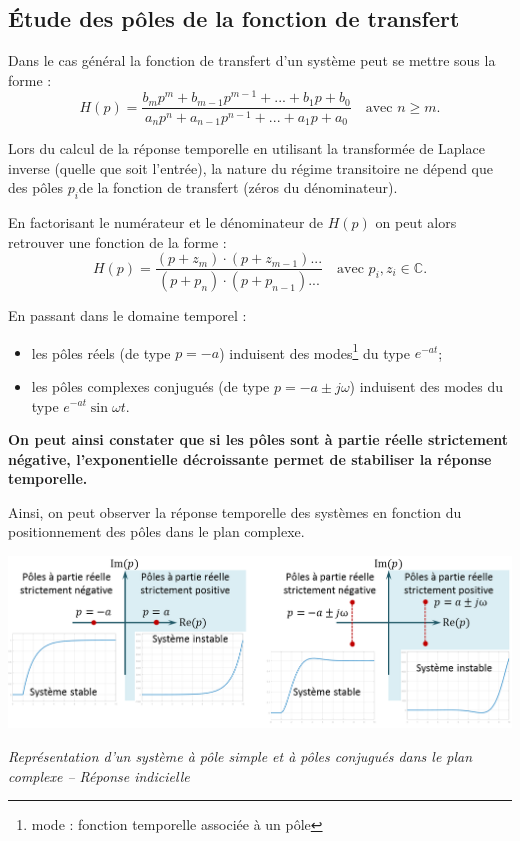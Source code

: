 \documentclass[10pt,fleqn]{article} %
\begin{document}
\subsection{Étude des pôles de la fonction de transfert}
Dans le cas général la fonction de transfert d'un système peut se mettre sous la forme :
$$
H(p)=\dfrac{b_mp^m + b_{m-1}p^{m-1}+...+b_1p+b_0}{a_np^n + a_{n-1}p^{n-1}+...+a_1p+a_0} \quad \text{avec } n\geq m.
$$

Lors du calcul de la réponse temporelle en utilisant la transformée de Laplace inverse (quelle que soit l'entrée), la nature du régime transitoire ne dépend que des pôles $p_i$de la fonction de transfert (zéros du dénominateur).

En factorisant le numérateur et le dénominateur de $H(p)$ on peut alors retrouver une fonction de la forme  :
$$
H(p)=\dfrac{\left(p+ z_m\right)\cdot \left(p+ z_{m-1}\right)...}{\left(p+ p_n\right)\cdot \left(p+ p_{n-1}\right)...} \quad \text{avec } p_i,z_i\in \mathbb{C}.
$$

En passant dans le domaine temporel : 
\begin{itemize}
\item les pôles réels (de type $p=-a$) induisent des modes\footnote{mode : fonction temporelle associée à un pôle} du type $e^{-at}$;
\item les pôles complexes conjugués (de type $p=-a\pm j\omega$) induisent des modes du type 
$e^{-at} \sin \omega t$.
\end{itemize}

\textbf{On peut ainsi constater que si les pôles sont à partie réelle strictement négative, l'exponentielle décroissante permet de stabiliser la réponse temporelle.}

Ainsi, on peut observer la réponse temporelle des systèmes en fonction du positionnement des pôles dans le plan complexe. 

\begin{center}
\includegraphics[width=14cm]{images/poles_simple_double}

\textit{Représentation d'un système à pôle simple et à pôles conjugués dans le plan complexe -- Réponse indicielle}
\end{center}
\end{document}

